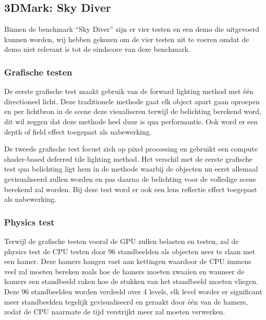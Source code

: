 \subsection{3DMark: Sky Diver}
Binnen de benchmark “Sky Diver” zijn er vier testen en een demo die uitgevoerd kunnen worden, wij hebben gekozen om de vier testen uit te voeren omdat de demo niet relevant is tot de eindscore van deze benchmark.

\subsubsection{Grafische testen}
De eerste grafische test maakt gebruik van de forward lighting method met één directioneel licht. Deze traditionele methode gaat elk object apart gaan oproepen en  per lichtbron in de scene deze visualiseren terwijl de belichting berekend word, dit wil zeggen dat deze methode heel duur is qua performantie. Ook word er een depth of field effect toegepast als nabewerking. \citep{3dmark_tech,3dmark_light}

De tweede grafische test focust zich op pixel processing en gebruikt een compute shader-based deferred tile lighting method. Het verschil met de eerste grafische test qua belichting ligt hem in de methode waarbij de objecten nu eerst allemaal gevisualiseerd zullen worden en pas daarna de belichting voor de volledige scene berekend zal worden. Bij deze test word er ook een lens reflectie effect toegepast als nabewerking. \citep{3dmark_tech,3dmark_light}


\subsubsection{Physics test}
Terwijl de grafische testen vooral de GPU zullen belasten en testen, zal de physics test de CPU testen door 96 standbeelden als objecten neer te slaan met een hamer. Deze hamers hangen vast aan kettingen waardoor de CPU immens veel zal moeten bereken zoals hoe de hamers moeten zwaaien en wanneer de hamers een standbeeld raken hoe de stukken van het standbeeld moeten vliegen. Deze 96 standbeelden worden verdeeld over 4 levels, elk level worder er significant meer standbeelden tegelijk gevisualiseerd en geraakt door één van de hamers, zodat de CPU naarmate de tijd verstrijkt meer zal moeten verwerken. \citep{3dmark_tech}


